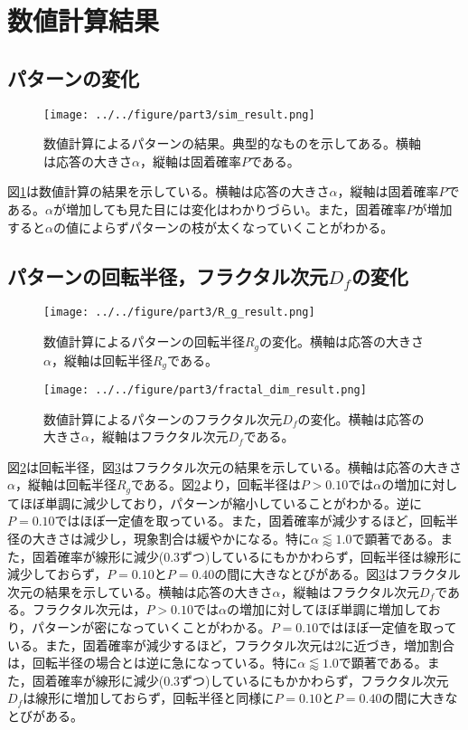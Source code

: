 \documentclass[autodetect-engine,dvi=dvipdfmx,a4paper,ja=standard,oneside,openany,11pt,draft]{bxjsbook}
\begin{document}
\section{数値計算結果}
\subsection{パターンの変化}
\begin{figure}[htbp]
  \centering
  \texttt{[image: ../../figure/part3/sim\_result.png]}
  \caption{数値計算によるパターンの結果。典型的なものを示してある。横軸は応答の大きさ$\alpha$，縦軸は固着確率$P$である。}
  \label{fig:sim_result}
\end{figure}
図\ref{fig:sim_result}は数値計算の結果を示している。横軸は応答の大きさ$\alpha$，縦軸は固着確率$P$である。$\alpha$が増加しても見た目には変化はわかりづらい。また，固着確率$P$が増加すると$\alpha$の値によらずパターンの枝が太くなっていくことがわかる。
\subsection{パターンの回転半径，フラクタル次元$D_f$の変化}
\begin{figure}[htbp]
  \centering
  \texttt{[image: ../../figure/part3/R\_g\_result.png]}
  \caption{数値計算によるパターンの回転半径$R_g$の変化。横軸は応答の大きさ$\alpha$，縦軸は回転半径$R_g$である。}
  \label{fig:R_g_result}
\end{figure}
\begin{figure}
  \centering
  \texttt{[image: ../../figure/part3/fractal\_dim\_result.png]}
  \caption{数値計算によるパターンのフラクタル次元$D_f$の変化。横軸は応答の大きさ$\alpha$，縦軸はフラクタル次元$D_f$である。}
  \label{fig:fractal_dim_result}
\end{figure}
図\ref{fig:R_g_result}は回転半径，図\ref{fig:fractal_dim_result}はフラクタル次元の結果を示している。横軸は応答の大きさ$\alpha$，縦軸は回転半径$R_g$である。図\ref{fig:R_g_result}より，回転半径は$P>0.10$では$\alpha$の増加に対してほぼ単調に減少しており，パターンが縮小していることがわかる。逆に$P=0.10$ではほぼ一定値を取っている。また，固着確率が減少するほど，回転半径の大きさは減少し，現象割合は緩やかになる。特に$\alpha\lessapprox1.0$で顕著である。また，固着確率が線形に減少(0.3ずつ)しているにもかかわらず，回転半径は線形に減少しておらず，$P=0.10$と$P=0.40$の間に大きなとびがある。図\ref{fig:fractal_dim_result}はフラクタル次元の結果を示している。横軸は応答の大きさ$\alpha$，縦軸はフラクタル次元$D_f$である。フラクタル次元は，$P>0.10$では$\alpha$の増加に対してほぼ単調に増加しており，パターンが密になっていくことがわかる。$P=0.10$ではほぼ一定値を取っている。また，固着確率が減少するほど，フラクタル次元は2に近づき，増加割合は，回転半径の場合とは逆に急になっている。特に$\alpha\lessapprox1.0$で顕著である。また，固着確率が線形に減少(0.3ずつ)しているにもかかわらず，フラクタル次元$D_f$は線形に増加しておらず，回転半径と同様に$P=0.10$と$P=0.40$の間に大きなとびがある。
\ifdraft{
  
  
}{}
\end{document}

